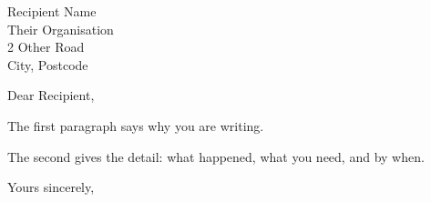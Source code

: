 \documentclass[11pt]{letter}
\begin{document}
\begin{letter}{Recipient Name \\ Their Organisation \\ 2 Other Road \\ City, Postcode}

\opening{Dear Recipient,}

The first paragraph says why you are writing.

The second gives the detail: what happened, what you need, and by when.

\closing{Yours sincerely,}


\end{letter}
\end{document}
